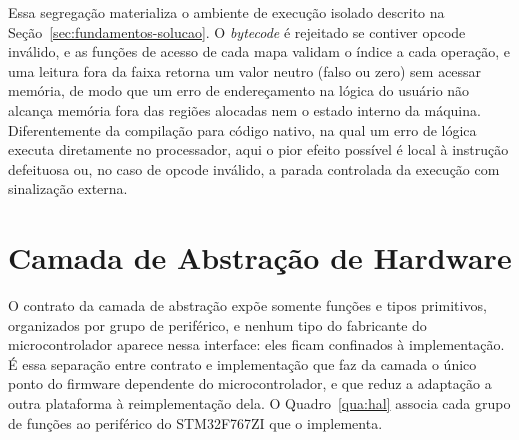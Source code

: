 Essa segregação materializa o ambiente de execução isolado descrito na Seção~\ref{sec:fundamentos-solucao}.
O \textit{bytecode} é rejeitado se contiver opcode inválido, e as funções de acesso de cada mapa validam o índice a cada operação, e uma leitura fora da faixa retorna um valor neutro (falso ou zero) sem acessar memória, de modo que um erro de endereçamento na lógica do usuário não alcança memória fora das regiões alocadas nem o estado interno da máquina.
Diferentemente da compilação para código nativo, na qual um erro de lógica executa diretamente no processador, aqui o pior efeito possível é local à instrução defeituosa ou, no caso de opcode inválido, a parada controlada da execução com sinalização externa.


\section{Camada de Abstração de Hardware}
\label{sec:hal-implementacao}

O contrato da camada de abstração expõe somente funções e tipos primitivos, organizados por grupo de periférico, e nenhum tipo do fabricante do microcontrolador aparece nessa interface: eles ficam confinados à implementação.
É essa separação entre contrato e implementação que faz da camada o único ponto do firmware dependente do microcontrolador, e que reduz a adaptação a outra plataforma à reimplementação dela.
O Quadro~\ref{qua:hal} associa cada grupo de funções ao periférico do STM32F767ZI que o implementa.

